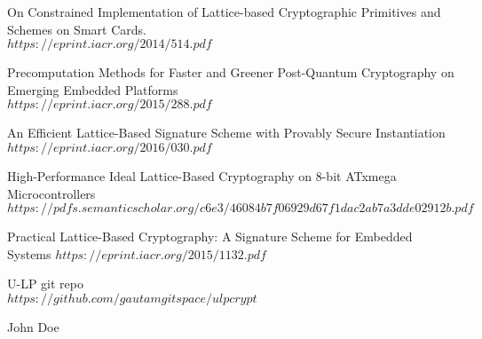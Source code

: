 \documentclass[conference]{IEEEtran}
\begin{document}
\begin{thebibliography}{10}
On Constrained Implementation of Lattice-based Cryptographic Primitives and Schemes on Smart Cards.\\
$https://eprint.iacr.org/2014/514.pdf$


Precomputation Methods for Faster and
Greener Post-Quantum Cryptography on
Emerging Embedded Platforms\\
$https://eprint.iacr.org/2015/288.pdf$


An Efficient Lattice-Based Signature Scheme with Provably Secure Instantiation\\
$https://eprint.iacr.org/2016/030.pdf$

High-Performance Ideal Lattice-Based Cryptography on 8-bit
ATxmega Microcontrollers\\
$https://pdfs.semanticscholar.org/c6e3/46084b7f06929d67f1dac2ab7a3dde02912b.pdf$

Practical Lattice-Based Cryptography:
A Signature Scheme for Embedded Systems
$https://eprint.iacr.org/2015/1132.pdf$

U-LP git repo\\
$https://github.com/gautamgitspace/ulpcrypt$

\end{thebibliography}



% 

\begin{IEEEbiography}{John Doe}
\blindtext
\end{IEEEbiography}







\end{document}
